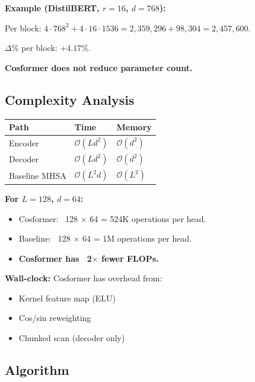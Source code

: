 \textbf{Example (DistilBERT, $r = 16$, $d = 768$):}

Per block: $4 \cdot 768^2 + 4 \cdot 16 \cdot 1536 = 2{,}359{,}296 + 98{,}304 
= 2{,}457{,}600$.

$\Delta$\% per block: $+4.17\%$.

\textbf{Cosformer does not reduce parameter count.}

\subsection{Complexity Analysis}

\begin{table}[H]
\centering
\small
\begin{tabular}{lll}
\toprule
\textbf{Path} & \textbf{Time} & \textbf{Memory} \\
\midrule
Encoder & $\mathcal{O}(L d^2)$ & $\mathcal{O}(d^2)$ \\
Decoder & $\mathcal{O}(L d^2)$ & $\mathcal{O}(d^2)$ \\
Baseline MHSA & $\mathcal{O}(L^2 d)$ & $\mathcal{O}(L^2)$ \\
\bottomrule
\end{tabular}
\end{table}

\textbf{For $L = 128$, $d = 64$:}
\begin{itemize}
\item Cosformer: ~128 $\times$ 64  = 524K operations per head.
\item Baseline: ~128  $\times$ 64 = 1M operations per head.
\item \textbf{Cosformer has ~2$\times$ fewer FLOPs.}

\end{itemize}
\textbf{Wall-clock:} Cosformer has overhead from:
\begin{itemize}
\item Kernel feature map (ELU)
\item Cos/sin reweighting
\item Chunked scan (decoder only)

\end{itemize}
\subsection{Algorithm}

